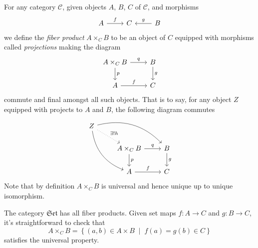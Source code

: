 \documentclass[dissertation.tex]{subfiles}
\begin{document}
\begin{defn}
  For any category $\mathscr{C}$, given objects $A$, $B$, $C$ of $\mathscr{C}$, and morphisms
  $$\begin{tikzcd}
    A \arrow{r}{f} & C & \arrow[swap]{l}{g} B
  \end{tikzcd}$$
  we define the {\em fiber product} $A \times_C B$ to be an object of $C$ equipped with morphisms called {\em projections} making the diagram
  $$\begin{tikzcd}
    A \times_C B \arrow{d}{p} \arrow{r}{q} & B\arrow{d}{g}\\
    A\arrow{r}{f} & C
  \end{tikzcd}$$
  commute and final amongst all such objects.
  That is to say, for any object $Z$ equipped with projects to $A$ and $B$, the following diagram commutes
  $$\begin{tikzcd}
    Z\arrow[bend right]{ddr}\arrow[bend left]{rrd} \arrow[dotted]{rd}{\exists ! h}& &\\
    & A \times_C B \arrow{r}{q}\arrow{d}{p} & B\arrow{d}{g}\\
    & A\arrow{r}{f} & C
  \end{tikzcd}$$
  Note that by definition $A \times_C B$ is universal and hence unique up to unique isomorphism.
\end{defn}

The category $\mathfrak{Set}$ has all fiber products.  Given set maps $f: A \rightarrow C$ and $g : B \rightarrow C$, it's straightforward to check that
$$A \times_C B = \left\{(a,b) \in A \times B \;\middle\vert\; f(a) = g(b) \in C\right\}$$
satisfies the universal property.
\end{document}
